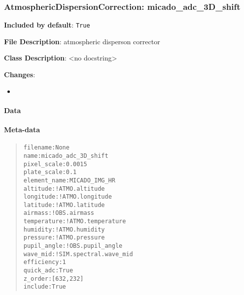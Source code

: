 \subsubsection{AtmosphericDispersionCorrection: \textquotedbl{}micado\_adc\_3D\_shift\textquotedbl{}%
  \label{atmosphericdispersioncorrection-micado-adc-3d-shift}%
}

\textbf{Included by default}: \texttt{True}

\textbf{File Description}: atmospheric disperson corrector

\textbf{Class Description}: <no docstring>

\textbf{Changes}:

\begin{itemize}
\item \end{itemize}


\paragraph{Data%
  \label{id1}%
}


\paragraph{Meta-data%
  \label{id2}%
}

\begin{quote}
\begin{alltt}
    filename : None
        name : micado_adc_3D_shift
 pixel_scale : 0.0015
 plate_scale : 0.1
element_name : MICADO_IMG_HR
    altitude : !ATMO.altitude
   longitude : !ATMO.longitude
    latitude : !ATMO.latitude
     airmass : !OBS.airmass
 temperature : !ATMO.temperature
    humidity : !ATMO.humidity
    pressure : !ATMO.pressure
 pupil_angle : !OBS.pupil_angle
    wave_mid : !SIM.spectral.wave_mid
  efficiency : 1
   quick_adc : True
     z_order : [632, 232]
     include : True
\end{alltt}
\end{quote}
